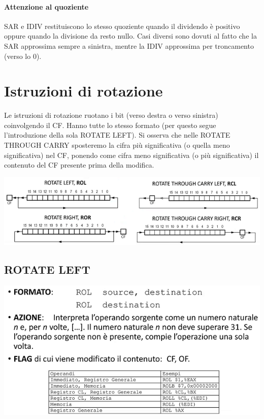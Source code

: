 \documentclass[11pt]{report}
\begin{document}
\paragraph{Attenzione al quoziente} SAR e IDIV restituiscono lo stesso quoziente quando il dividendo è positivo oppure quando la divisione da resto nullo. Casi diversi sono dovuti al fatto che la SAR approssima sempre a sinistra, mentre la IDIV approssima per troncamento (verso lo 0).

\section{Istruzioni di rotazione}
Le istruzioni di rotazione ruotano i bit (verso destra o verso sinistra) coinvolgendo il CF. Hanno tutte lo stesso formato (per questo segue l'introduzione della sola ROTATE LEFT). Si osserva che nelle ROTATE THROUGH CARRY sposteremo la cifra più significativa (o quella meno significativa) nel CF, ponendo come cifra meno significativa (o più significativa) il contenuto del CF presente prima della modifica.
\begin{center}
\includegraphics{img/30.PNG}
\end{center}
\subsection{ROTATE LEFT}
\begin{center}
\includegraphics{img/31.PNG}
\end{center}
\end{document}
